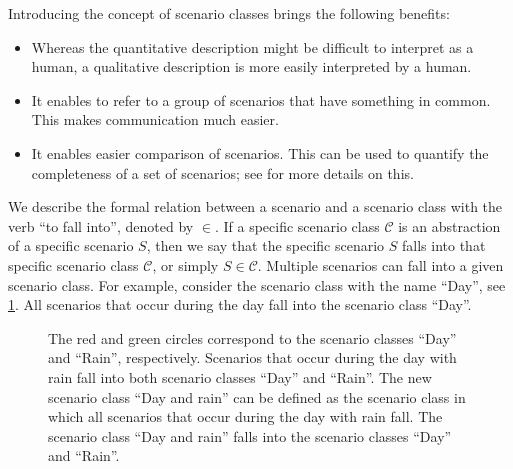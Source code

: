Introducing the concept of scenario classes brings the following benefits:
\begin{itemize}
	\item Whereas the quantitative description might be difficult to interpret as a human, a qualitative description is more easily interpreted by a human.
	\item It enables to refer to a group of scenarios that have something in common. This makes communication much easier.
	\item It enables easier comparison of scenarios. This can be used to quantify the completeness of a set of scenarios; see \cite{degelder2019completeness} for more details on this.
\end{itemize}

We describe the formal relation between a scenario and a scenario class with the verb ``to fall into'', denoted by $\in$. If a specific scenario class $\mathcal{C}$ is an abstraction of a specific scenario $S$, then we say that the specific scenario $S$ falls into that specific scenario class $\mathcal{C}$, or simply $S \in \mathcal{C}$. Multiple scenarios can fall into a given scenario class. For example, consider the scenario class with the name ``Day'', see \cref{fig:venn diagram scenario class}. All scenarios that occur during the day fall into the scenario class ``Day''.

\setlength{\venncircle}{7em}
\begin{figure}
	\centering
	\caption{The red and green circles correspond to the scenario classes ``Day'' and ``Rain'', respectively. Scenarios that occur during the day with rain fall into both scenario classes ``Day'' and ``Rain''. The new scenario class ``Day and rain'' can be defined as the scenario class in which all scenarios that occur during the day with rain fall. The scenario class ``Day and rain'' falls into the scenario classes ``Day'' and ``Rain''.}
	\label{fig:venn diagram scenario class}
\end{figure}


